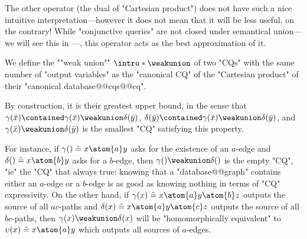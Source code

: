 The other operator (the dual of "Cartesian product")
does not have such a nice intuitive interpretation---however
it does not mean that it will be less useful, on the contrary!
While "conjunctive queries" are not closed under
semantical union---we will see this in ---, this operator
acts as the best approximation of it.

\begin{definition}
	We define the \AP""weak union"" \AP$\intro*\weakunion$ of two "CQs"
	with the same number of "output variables"
	as the "canonical CQ" of the "Cartesian product" of their "canonical database@@cqs@@cq".
\end{definition}

By construction, it is their greatest upper bound,
in the sense that
$\gamma(\bar x) \contained \gamma(\bar x) \weakunion \delta(\bar y)$,
$\delta(\bar y) \contained \gamma(\bar x) \weakunion \delta(\bar y)$,
and $\gamma(\bar x) \weakunion \delta(\bar y)$ is the smallest "CQ" satisfying this property.

For instance, if $\gamma() \defeq x \atom{a} y$ asks for the existence of an $a$-edge
and $\delta() \defeq x \atom{b} y$ asks for a $b$-edge,
then $\gamma() \weakunion \delta()$ is the empty "CQ",
"ie" the "CQ" that always true: knowing that a "database@@graph" contains either an $a$-edge
or a $b$-edge is as good as knowing nothing in terms of "CQ" expressivity.
On the other hand, if $\gamma(x) \defeq x \atom{a} y \atom{b} z$ outputs the source of all 
$ac$-paths and $\delta(x) \defeq x \atom{a} y \atom{c} z$ outputs the source of all $bc$-paths,
then $\gamma(x) \weakunion \delta(x)$ will be "homomorphically equivalent" to
$\upsilon(x) \defeq x \atom{a} y$ which outputs all sources of $a$-edges.


